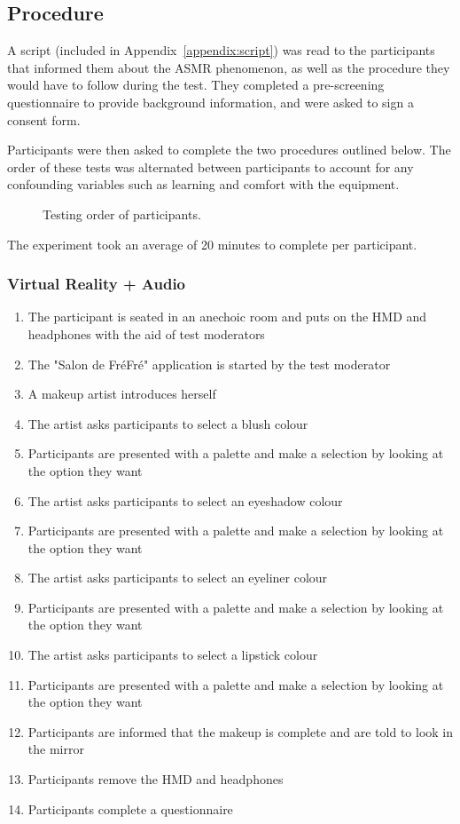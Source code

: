 \documentclass{sigchi}
\begin{document}
\subsection{Procedure}
A script (included in Appendix~\ref{appendix:script}) was read to the participants that informed them about the ASMR phenomenon, as well as the procedure they would have to follow during the test. They completed a pre-screening questionnaire to provide background information, and were asked to sign a consent form.

Participants were then asked to complete the two procedures outlined below. The order of these tests was alternated between participants to account for any confounding variables such as learning and comfort with the equipment.

\begin{figure}[htb]
\centering
{}
\caption{Testing order of participants.}
\label{fig:testing_order}
\end{figure}

The experiment took an average of 20 minutes to complete per participant.

\subsubsection{Virtual Reality + Audio}
\begin{enumerate}
\item{The participant is seated in an anechoic room and puts on the HMD and headphones with the aid of test moderators}
\item{The "Salon de Fr\'{e}Fr\'{e}" application is started by the test moderator}
\item{A makeup artist introduces herself}
\item{The artist asks participants to select a blush colour}
\item{Participants are presented with a palette and make a selection by looking at the option they want}
\item{The artist asks participants to select an eyeshadow colour}
\item{Participants are presented with a palette and make a selection by looking at the option they want}
\item{The artist asks participants to select an eyeliner colour}
\item{Participants are presented with a palette and make a selection by looking at the option they want}
\item{The artist asks participants to select a lipstick colour}
\item{Participants are presented with a palette and make a selection by looking at the option they want}
\item{Participants are informed that the makeup is complete and are told to look in the mirror}
\item{Participants remove the HMD and headphones}
\item{Participants complete a questionnaire}
\end{enumerate}
\end{document}
